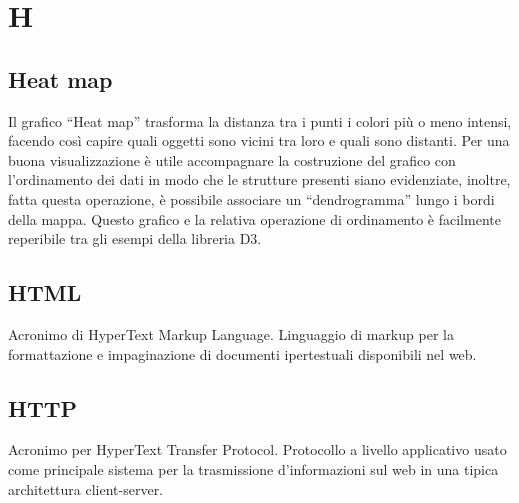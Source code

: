 \section*{H}
\markright{}
\subsection*{Heat map}
Il grafico “Heat map” trasforma la distanza tra i punti i colori più o meno intensi, facendo così capire quali oggetti sono vicini tra loro e quali sono distanti. Per una buona visualizzazione è utile accompagnare la costruzione del grafico con l’ordinamento dei dati in modo che le strutture presenti siano evidenziate, inoltre, fatta questa operazione, è possibile associare un “dendrogramma” lungo i bordi della mappa. Questo grafico e la relativa operazione di ordinamento è facilmente reperibile tra gli esempi della libreria D3.
\subsection*{HTML}
Acronimo di HyperText Markup Language. Linguaggio di markup per la formattazione e impaginazione di documenti ipertestuali disponibili nel web.
\subsection*{HTTP}
Acronimo per HyperText Transfer Protocol. Protocollo a livello applicativo usato come principale sistema per la trasmissione d'informazioni sul web in una tipica architettura client-server.